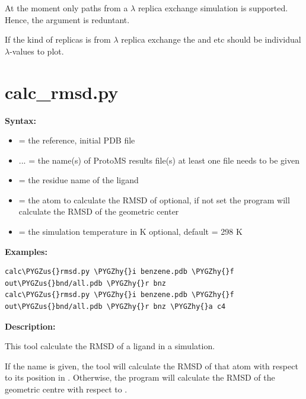 \documentclass[letterpaper,10pt,english]{sphinxmanual}
\def\PYGZus{\char`\_}
\def\PYGZhy{\char`\-}
\begin{document}
At the moment only paths from a \(\lambda\) replica exchange simulation is supported. Hence, the  argument is reduntant.

If the kind of replicas is from \(\lambda\) replica exchange the  and  etc should be individual \(\lambda\)-values to plot.


\section{calc\_rmsd.py}
\label{tools:calc-rmsd-py}
\textbf{Syntax:}

\begin{itemize}
\item {} 
 = the reference, initial PDB file

\item {} 
 ... = the name(s) of ProtoMS results file(s)
at least one file needs to be given

\item {} 
 = the residue name of the ligand

\item {} 
 = the atom to calculate the RMSD of
optional, if not set the program will calculate the RMSD of the geometric center

\item {} 
 = the simulation temperature in K
optional, default = 298 K

\end{itemize}

\textbf{Examples:}

\begin{Verbatim}[commandchars=\\\{\}]
calc\PYGZus{}rmsd.py \PYGZhy{}i benzene.pdb \PYGZhy{}f out\PYGZus{}bnd/all.pdb \PYGZhy{}r bnz
calc\PYGZus{}rmsd.py \PYGZhy{}i benzene.pdb \PYGZhy{}f out\PYGZus{}bnd/all.pdb \PYGZhy{}r bnz \PYGZhy{}a c4
\end{Verbatim}

\textbf{Description:}

This tool calculate the RMSD of a ligand in a simulation.

If the  name is given, the tool will calculate the RMSD of that atom with respect to its position in . Otherwise, the program will calculate the RMSD of the geometric centre with respect to .
\end{document}
